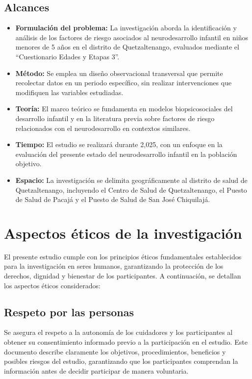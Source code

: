 \documentclass[11pt,letterpaper]{report}
\newcommand{\tiempito}{durante 2,025}
\newcommand{\asq}{“Cuestionario Edades y Etapas 3”}
\begin{document}
\subsection{Alcances}
\begin{itemize}
    \item \textbf{Formulación del problema:} La investigación aborda la
		identificación y análisis de los factores de riesgo asociados al
		neurodesarrollo infantil en niños menores de 5 años en el distrito de
		Quetzaltenango, evaluados mediante el \asq.
    \item \textbf{Método:} Se emplea un diseño observacional transversal que
		permite recolectar datos en un periodo específico, sin realizar
		intervenciones que modifiquen las variables estudiadas.
    \item \textbf{Teoría:} El marco teórico se fundamenta en modelos
		biopsicosociales del desarrollo infantil y en la literatura previa
		sobre factores de riesgo relacionados con el neurodesarrollo en
		contextos similares.
    \item \textbf{Tiempo:} El estudio se realizará \tiempito, con un enfoque en
		la evaluación del presente estado del neurodesarrollo infantil en la 
		población objetivo.
    \item \textbf{Espacio:} La investigación se delimita geográficamente al
		distrito de salud de Quetzaltenango, incluyendo el Centro de Salud de
		Quetzaltenango, el Puesto de Salud de Pacajá y el Puesto de Salud de
		San José Chiquilajá.
\end{itemize}

\section{Aspectos éticos de la investigación}
El presente estudio cumple con los principios éticos fundamentales establecidos
para la investigación en seres humanos, garantizando la protección de los
derechos, dignidad y bienestar de los participantes. A continuación, se
detallan los aspectos éticos considerados:

\subsection{Respeto por las personas}
Se asegura el respeto a la autonomía de los cuidadores y los participantes al
obtener su consentimiento informado previo a la participación en el estudio.
Este documento describe claramente los objetivos, procedimientos, beneficios y
posibles riesgos del estudio, garantizando que los participantes comprendan la
información antes de decidir participar de manera voluntaria.
\end{document}
